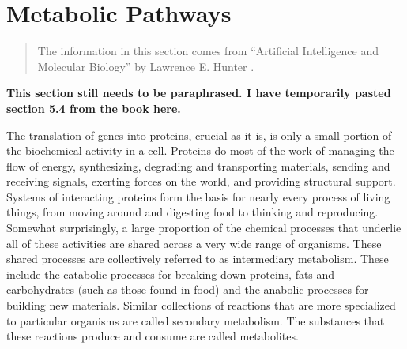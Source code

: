 \section{Metabolic Pathways}
\label{sect:metabolic_pathways}

\begin{verse}
    The information in this section comes from ``Artificial Intelligence and
    Molecular Biology'' by Lawrence E. Hunter \cite{mb-for-cs}.
\end{verse}

\textbf{This section still needs to be paraphrased. I have temporarily pasted
section 5.4 from the book here.}

The translation of genes into proteins, crucial as it is, is only a small
portion of the biochemical activity in a cell. Proteins do most of the work of
managing the flow of energy, synthesizing, degrading and transporting
materials, sending and receiving signals, exerting forces on the world, and
providing structural support. Systems of interacting proteins form the basis for
nearly every process of living things, from moving around and digesting food to
thinking and reproducing. Somewhat surprisingly, a large proportion of the
chemical processes that underlie all of these activities are shared across a
very wide range of organisms. These shared processes are collectively referred
to as intermediary metabolism. These include the catabolic processes for
breaking down proteins, fats and carbohydrates (such as those found in food) and
the anabolic processes for building new materials. Similar collections of
reactions that are more specialized to particular organisms are called secondary
metabolism. The substances that these reactions produce and consume are called
metabolites.

